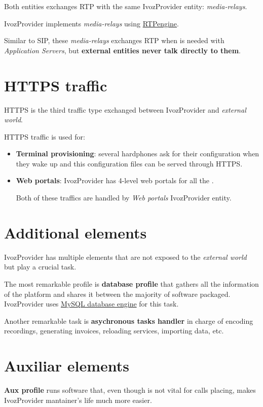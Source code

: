 \documentclass[letterpaper,10pt,english]{sphinxmanual}
\begin{document}
Both entities exchanges RTP with the same IvozProvider entity: \emph{media-relays}.

IvozProvider implements \emph{media-relays} using \href{https://github.com/sipwise/rtpengine}{RTPengine}.

Similar to SIP, these \emph{media-relays} exchanges RTP when is needed with
\emph{Application Servers}, but \textbf{external entities never talk directly to them}.


\section{HTTPS traffic}
\label{basics/architecture/index:https-traffic}
HTTPS is the third traffic type exchanged between IvozProvider and \emph{external
world}.

HTTPS traffic is used for:
\begin{itemize}
\item {} 
\textbf{Terminal provisioning}: several hardphones ask for their configuration when
they wake up and this configuration files can be served through HTTPS.

\item {} 
\textbf{Web portals}: IvozProvider has 4-level web portals for all the
{\hyperref[basics/operation_roles/index:operation\string-roles]{}}.

Both of these traffics are handled by \emph{Web portals} IvozProvider entity.

\end{itemize}


\section{Additional elements}
\label{basics/architecture/index:additional-elements}
IvozProvider has multiple elements that are not exposed to the \emph{external world}
but play a crucial task.

The most remarkable profile is \textbf{database profile} that gathers all the
information of the platform and shares it between the majority of software packaged.
IvozProvider uses \href{https://www.mysql.com/}{MySQL database engine} for this task.

Another remarkable task is \textbf{asychronous tasks handler} in charge of encoding recordings,
generating invoices, reloading services, importing data, etc.


\section{Auxiliar elements}
\label{basics/architecture/index:auxiliar-elements}
\textbf{Aux profile} runs software that, even though is not vital for calls placing,
makes IvozProvider mantainer's life much more easier.
\end{document}
